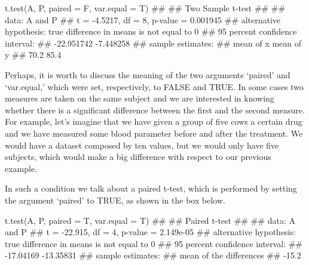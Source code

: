 \documentclass[a4paper,12pt,oneside]{book}
\newenvironment{Shaded}{\begin{snugshade}}{\end{snugshade}}
\newcommand{\DocumentationTok}[1]{#1}
\newcommand{\FunctionTok}[1]{#1}
\newcommand{\AttributeTok}[1]{#1}
\newcommand{\NormalTok}[1]{#1}
\begin{document}
\begin{Shaded}
\begin{Highlighting}[]
\FunctionTok{t.test}\NormalTok{(A, P, }\AttributeTok{paired =}\NormalTok{ F, }\AttributeTok{var.equal =}\NormalTok{ T)}
\DocumentationTok{\#\# }
\DocumentationTok{\#\#  Two Sample t{-}test}
\DocumentationTok{\#\# }
\DocumentationTok{\#\# data:  A and P}
\DocumentationTok{\#\# t = {-}4.5217, df = 8, p{-}value = 0.001945}
\DocumentationTok{\#\# alternative hypothesis: true difference in means is not equal to 0}
\DocumentationTok{\#\# 95 percent confidence interval:}
\DocumentationTok{\#\#  {-}22.951742  {-}7.448258}
\DocumentationTok{\#\# sample estimates:}
\DocumentationTok{\#\# mean of x mean of y }
\DocumentationTok{\#\#      70.2      85.4}
\end{Highlighting}
\end{Shaded}

Perhaps, it is worth to discuss the meaning of the two arguments `paired' and `var.equal,' which were set, respectively, to FALSE and TRUE. In some cases two measures are taken on the same subject and we are interested in knowing whether there is a significant difference between the first and the second measure. For example, let's imagine that we have given a group of five cows a certain drug and we have measured some blood parameter before and after the treatment. We would have a dataset composed by ten values, but we would only have five subjects, which would make a big difference with respect to our previous example.

In such a condition we talk about a paired t-test, which is performed by setting the argument `paired' to TRUE, as shown in the box below.

\begin{Shaded}
\begin{Highlighting}[]
\FunctionTok{t.test}\NormalTok{(A, P, }\AttributeTok{paired =}\NormalTok{ T, }\AttributeTok{var.equal =}\NormalTok{ T)}
\DocumentationTok{\#\# }
\DocumentationTok{\#\#  Paired t{-}test}
\DocumentationTok{\#\# }
\DocumentationTok{\#\# data:  A and P}
\DocumentationTok{\#\# t = {-}22.915, df = 4, p{-}value = 2.149e{-}05}
\DocumentationTok{\#\# alternative hypothesis: true difference in means is not equal to 0}
\DocumentationTok{\#\# 95 percent confidence interval:}
\DocumentationTok{\#\#  {-}17.04169 {-}13.35831}
\DocumentationTok{\#\# sample estimates:}
\DocumentationTok{\#\# mean of the differences }
\DocumentationTok{\#\#                   {-}15.2}
\end{Highlighting}
\end{Shaded}
\end{document}
